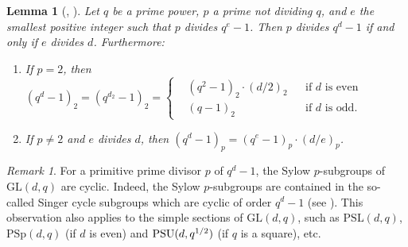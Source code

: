 \documentclass[12pt]{amsart}
\newtheorem{lem}[thm]{Lemma}
\theoremstyle{remark}
\newtheorem{rem}[thm]{Remark}
\theoremstyle{definition}
\newcommand{\PSL}{\mathrm{PSL}}
\newcommand{\GL}{\mathrm{GL}}
\newcommand{\PSU}{\textnormal{PSU}}
\begin{document}
\begin{lem}[{\cite[Lemma 4.1]{involutions}, \cite[Lemma 4.1]{abundant}}]\label{lemma:p-part}
Let $q$ be a prime power, $p$ a prime not dividing $q$, and $e$ the smallest positive integer such that $p$ divides $q^e-1$. Then $p$ divides $q^d-1$ if and only if $e$ divides $d$. Furthermore:
	\begin{enumerate}
	\item \label{p=2} If $p=2$, then $(q^d-1)_2 = (q^{d_2}-1)_2 = \left\{ \begin{aligned} &(q^2-1)_2 \cdot (d/2)_2 &&\text{if $d$ is even} \\ &(q-1)_2 &&\text{if $d$ is odd.} \end{aligned} \right.$
	
	\item \label{p>2} If $p \neq 2$ and $e$ divides $d$, then $(q^d-1)_p = (q^e-1)_p \cdot (d/e)_p$.
	\end{enumerate}
\end{lem}


\begin{rem} \label{rem:psylcyclic}
For a primitive prime divisor $p$ of $q^d-1$, the Sylow $p$-subgroups of $\GL(d,q)$ are cyclic. Indeed, the Sylow $p$-subgroups are contained  in the so-called Singer cycle subgroups which are cyclic of order $q^d-1$ (see \cite[Kapitel I, 7.3]{HuppertI}). This observation also applies to the simple sections of $\GL(d,q)$, such as $\PSL(d,q)$, $\mathrm{PSp}(d,q)$ (if $d$ is even) and $\PSU(d,q^{1/2})$ (if $q$ is a square), etc.
\end{rem}
\end{document}

